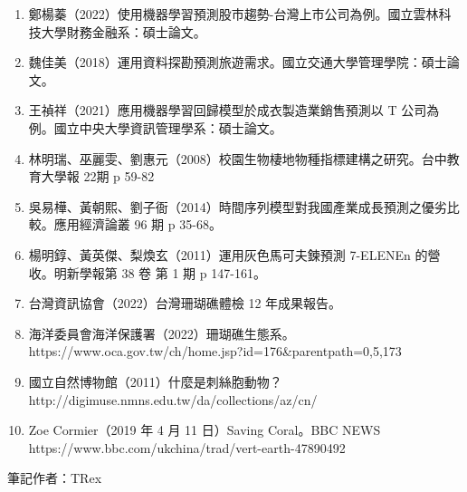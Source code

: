 \documentclass[12pt]{ctexart}
\begin{document}
\begin{enumerate}
    \item 鄭楊蓁（2022）使用機器學習預測股市趨勢-台灣上市公司為例。國立雲林科技大學財務金融系：碩士論文。
    \item 魏佳美（2018）運用資料探勘預測旅遊需求。國立交通大學管理學院：碩士論文。
    \item 王禎祥（2021）應用機器學習回歸模型於成衣製造業銷售預測以 T 公司為例。國立中央大學資訊管理學系：碩士論文。
    \item 林明瑞、巫麗雯、劉惠元（2008）校園生物棲地物種指標建構之研究。台中教育大學報 22期 p 59-82
    \item 吳易樺、黃朝熙、劉子衙（2014）時間序列模型對我國產業成長預測之優劣比較。應用經濟論叢 96 期 p 35-68。
    \item 楊明錞、黃英傑、梨煥玄（2011）運用灰色馬可夫鍊預測 7-ELENEn 的營收。明新學報第 38 卷 第 1 期 p 147-161。
    \item 台灣資訊協會（2022）台灣珊瑚礁體檢 12 年成果報告。
    \item 海洋委員會海洋保護署（2022）珊瑚礁生態系。 \\ https://www.oca.gov.tw/ch/home.jsp?id=176&parentpath=0,5,173
    \item 國立自然博物館（2011）什麼是刺絲胞動物？ \\ http://digimuse.nmns.edu.tw/da/collections/az/cn/
    \item Zoe Cormier（2019 年 4 月 11 日）Saving Coral。BBC NEWS \\ https://www.bbc.com/ukchina/trad/vert-earth-47890492
\end{enumerate}


\begin{tcolorbox}
筆記作者：TRex \\ 
\end{tcolorbox}
\end{document}
